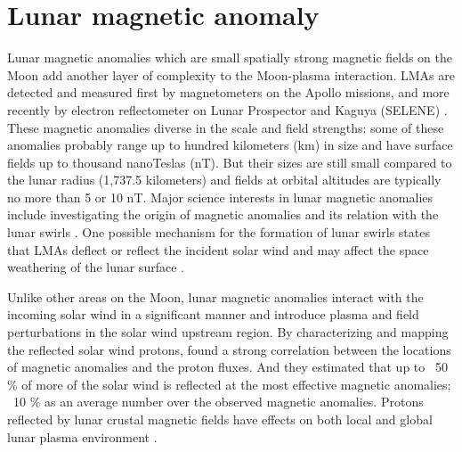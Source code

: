 \section{Lunar magnetic anomaly}

Lunar magnetic anomalies which are small spatially strong magnetic fields on the Moon add another layer of complexity to the Moon-plasma interaction. LMAs are detected and measured first by magnetometers on the Apollo missions, and more recently by electron reflectometer on Lunar Prospector \citep{mitchellGlobalMappingLunar2008} and Kaguya (SELENE) \citep{hoodNewLargeScaleMap2021}. These magnetic anomalies diverse in the scale and field strengths: some of these anomalies probably range up to hundred kilometers (km) in size and have surface fields up to thousand nanoTeslas (nT). But their sizes are still small compared to the lunar radius (1,737.5 kilometers) and fields at orbital altitudes are typically no more than 5 or 10 nT. Major science interests in lunar magnetic anomalies include investigating the origin of magnetic anomalies and its relation with the lunar swirls \citep{hoodLunarMagneticAnomalies2021}. One possible mechanism for the formation of lunar swirls states that LMAs deflect or reflect the incident solar wind and may affect the space weathering of the lunar surface \citep{poppeParticleincellSimulationsSolar2012}.

Unlike other areas on the Moon, lunar magnetic anomalies interact with the incoming solar wind in a significant manner and introduce plasma and field perturbations in the solar wind upstream region. By characterizing and mapping the reflected solar wind protons, \citep{lueStrongInfluenceLunar2011} found a strong correlation between the locations of magnetic anomalies and the proton fluxes. And they estimated that up to ~50 \% of more of the solar wind is reflected at the most effective magnetic anomalies; ~10 \% as an average number over the observed magnetic anomalies. Protons reflected by lunar crustal magnetic fields have effects on both local and global lunar plasma environment \citep{fatemiEffectsProtonsReflected2014}.




